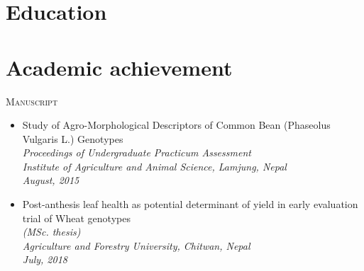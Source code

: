 \documentclass[11pt,a4paper,sans]{moderncv}
\begin{document}
\makecvtitle

\section{Education}

\section{Academic achievement}


\begin{minipage}[t]{.15\textwidth}
\hfill \textsc{Manuscript}
\end{minipage}
\hfill\vline\hfill
\begin{minipage}[t]{.80\textwidth}
\begin{itemize}
\item{Study of Agro-Morphological Descriptors of Common Bean (Phaseolus Vulgaris L.) Genotypes\\
\textit{Proceedings of Undergraduate Practicum Assessment} \\
\textit{Institute of Agriculture and Animal Science, Lamjung, Nepal} \\
\textit{August, 2015}}
\item{Post-anthesis leaf health as potential determinant of yield in early evaluation trial of Wheat genotypes\\
\textit{(MSc. thesis)}} \\
\textit{Agriculture and Forestry University, Chitwan, Nepal} \\
\textit{July, 2018}
\end{itemize}

\end{minipage}\\
\vspace{.15cm}
\end{document}
